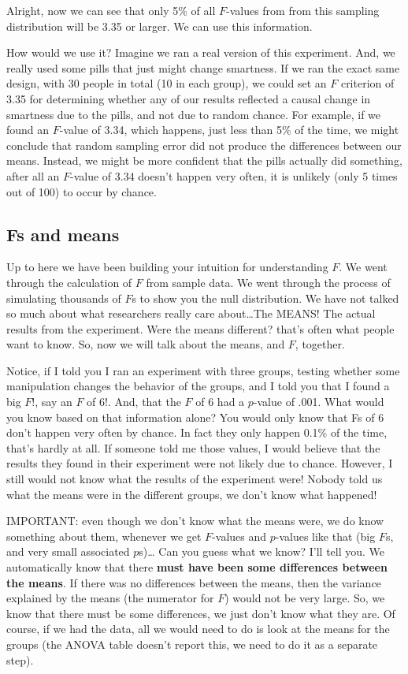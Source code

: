 \documentclass[
  letterpaper,
  DIV=11,
  numbers=noendperiod]{scrreprt}
\begin{document}
Alright, now we can see that only 5\% of all \(F\)-values from from this
sampling distribution will be 3.35 or larger. We can use this
information.

How would we use it? Imagine we ran a real version of this experiment.
And, we really used some pills that just might change smartness. If we
ran the exact same design, with 30 people in total (10 in each group),
we could set an \(F\) criterion of 3.35 for determining whether any of
our results reflected a causal change in smartness due to the pills, and
not due to random chance. For example, if we found an \(F\)-value of
3.34, which happens, just less than 5\% of the time, we might conclude
that random sampling error did not produce the differences between our
means. Instead, we might be more confident that the pills actually did
something, after all an \(F\)-value of 3.34 doesn't happen very often,
it is unlikely (only 5 times out of 100) to occur by chance.

\subsection{Fs and means}\label{fs-and-means}

Up to here we have been building your intuition for understanding \(F\).
We went through the calculation of \(F\) from sample data. We went
through the process of simulating thousands of \(F\)s to show you the
null distribution. We have not talked so much about what researchers
really care about\ldots The MEANS! The actual results from the
experiment. Were the means different? that's often what people want to
know. So, now we will talk about the means, and \(F\), together.

Notice, if I told you I ran an experiment with three groups, testing
whether some manipulation changes the behavior of the groups, and I told
you that I found a big \(F\)!, say an \(F\) of 6!. And, that the \(F\)
of 6 had a \(p\)-value of .001. What would you know based on that
information alone? You would only know that Fs of 6 don't happen very
often by chance. In fact they only happen 0.1\% of the time, that's
hardly at all. If someone told me those values, I would believe that the
results they found in their experiment were not likely due to chance.
However, I still would not know what the results of the experiment were!
Nobody told us what the means were in the different groups, we don't
know what happened!

IMPORTANT: even though we don't know what the means were, we do know
something about them, whenever we get \(F\)-values and \(p\)-values like
that (big \(F\)s, and very small associated \(p\)s)\ldots{} Can you
guess what we know? I'll tell you. We automatically know that there
\textbf{must have been some differences between the means}. If there was
no differences between the means, then the variance explained by the
means (the numerator for \(F\)) would not be very large. So, we know
that there must be some differences, we just don't know what they are.
Of course, if we had the data, all we would need to do is look at the
means for the groups (the ANOVA table doesn't report this, we need to do
it as a separate step).
\end{document}

